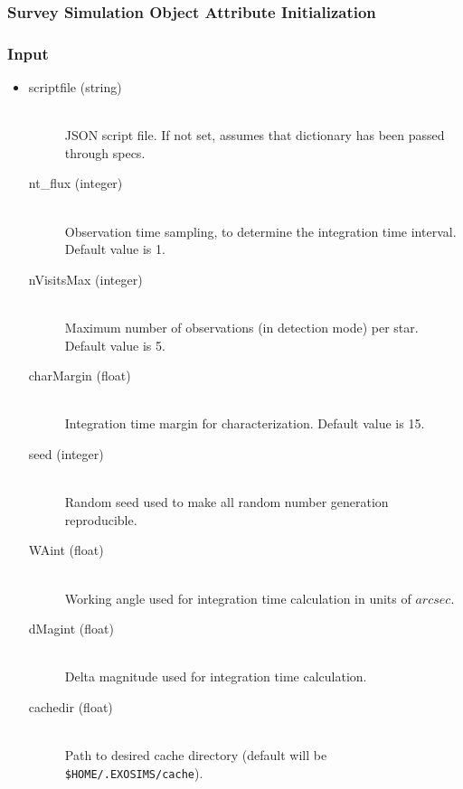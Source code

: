 \documentclass[cleanfoot]{asme2ej}
\begin{document}

\subsubsection{Survey Simulation Object Attribute Initialization}

\subsubsection*{Input}
\begin{itemize}
\item 
\begin{description}
    \item[scriptfile (string)] \hfill \\ JSON script file.  If not set, assumes that dictionary has been passed through specs.
    \item[nt\_flux (integer)] \hfill \\ Observation time sampling, to determine the integration time interval. Default value is 1.
    \item[nVisitsMax (integer)] \hfill \\ Maximum number of observations (in detection mode) per star. Default value is 5.
    \item[charMargin (float)] \hfill \\ Integration time margin for characterization. Default value is 15.
    \item[seed (integer)] \hfill \\ Random seed used to make all random number generation reproducible.
    \item[WAint (float)] \hfill \\ Working angle used for integration time calculation in units of $arcsec$.
    \item[dMagint (float)] \hfill \\ Delta magnitude used for integration time calculation.
    \item[cachedir (float)] \hfill \\ Path to desired cache directory (default will be \texttt{\$HOME/.EXOSIMS/cache}).
\end{description}
\end{itemize}
\end{document}
